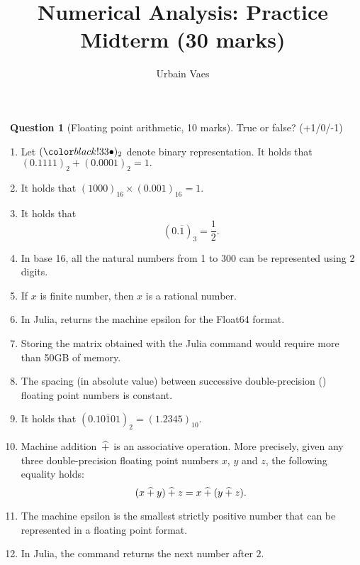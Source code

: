 \documentclass[11pt]{article}
\theoremstyle{definition}
\newtheorem{question}{{\normalfont \faGears}~Question}
\begin{document}
\title{Numerical Analysis: Practice Midterm (30 marks)}
\author{Urbain Vaes}
\maketitle

\begin{question}
    [Floating point arithmetic, 10 marks]
    True or false? (+1/0/-1)
    \begin{enumerate}
        \item Let $(\placeholder)_2$ denote binary representation.
            It holds that
            \(
                (0.1111)_2 + (0.0001)_2 = 1.
            \)
        \item It holds that
            \(
                (1000)_{16} \times (0.001)_{16} = 1.
            \)
        \item It holds that
            \[
                (0.\overline{1})_3 = \frac{1}{2}.
            \]

        \item
            In base 16, all the natural numbers from 1 to 300 can be represented using 2 digits.

        \item
            If $x$ is finite  number,
            then $x$ is a rational number.

        \item
            In Julia,  returns the machine epsilon for the Float64 format.

        \item
            Storing the matrix obtained with the Julia command  would require more than 50GB of memory.

        \item
            The spacing (in absolute value) between successive double-precision () floating point numbers is constant.

        \item
            It holds that $(0.\overline{10101})_2 = (1.2345)_{10}$.

        \item Machine addition~$\mathbin{\widehat +}$ is an associative operation.
            More precisely, given any three double-precision floating point numbers $x$, $y$ and $z$,
            the following equality holds:
            \[
                (x \mathbin{\widehat +} y) \mathbin{\widehat +} z = x \mathbin{\widehat +} (y \mathbin{\widehat +} z).
            \]
        \item
            The machine epsilon is the smallest strictly positive number that can be represented in a floating point format.

        \item
            In Julia, the command  returns
            the next  number after $2$.
    \end{enumerate}
\end{question}
\end{document}
